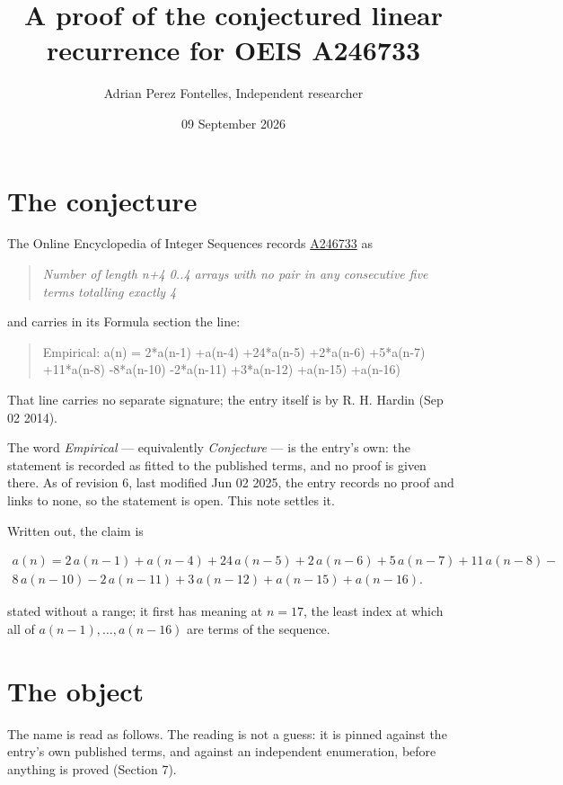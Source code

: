 \documentclass[11pt]{article}
\title{A proof of the conjectured linear recurrence for OEIS A246733}
\author{Adrian Perez Fontelles, Independent researcher}
\date{09 September 2026}
\theoremstyle{definition}
\begin{document}
\maketitle
\section{The conjecture}

The Online Encyclopedia of Integer Sequences records \href{https://oeis.org/A246733}{A246733} as

\begin{quote}\itshape Number of length n+4 0..4 arrays with no pair in any consecutive five terms totalling exactly 4\end{quote}

and carries in its Formula section the line:

\begin{quote}\ttfamily Empirical: a(n) = 2*a(n-1) +a(n-4) +24*a(n-5) +2*a(n-6) +5*a(n-7) +11*a(n-8) -8*a(n-10) -2*a(n-11) +3*a(n-12) +a(n-15) +a(n-16)\end{quote}

That line carries no separate signature; the entry itself is by R. H. Hardin (Sep 02 2014).

The word {\itshape Empirical} --- equivalently {\itshape Conjecture} --- is the entry's own: the statement is recorded as fitted to the published terms, and no proof is given there. As of revision 6, last modified Jun 02 2025, the entry records no proof and links to none, so the statement is open. This note settles it.

Written out, the claim is

\begin{multline*} a(n) = 2\,a(n-1) + a(n-4) + 24\,a(n-5) + 2\,a(n-6) + 5\,a(n-7) + 11\,a(n-8) - \\ 8\,a(n-10) - 2\,a(n-11) + 3\,a(n-12) + a(n-15) + a(n-16). \end{multline*}

stated without a range; it first has meaning at $n = 17$, the least index at which all of $a(n-1),\dots,a(n-16)$ are terms of the sequence.

\section{The object}

The name is read as follows. The reading is not a guess: it is pinned against the entry's own published terms, and against an independent enumeration, before anything is proved (Section 7).
\end{document}
